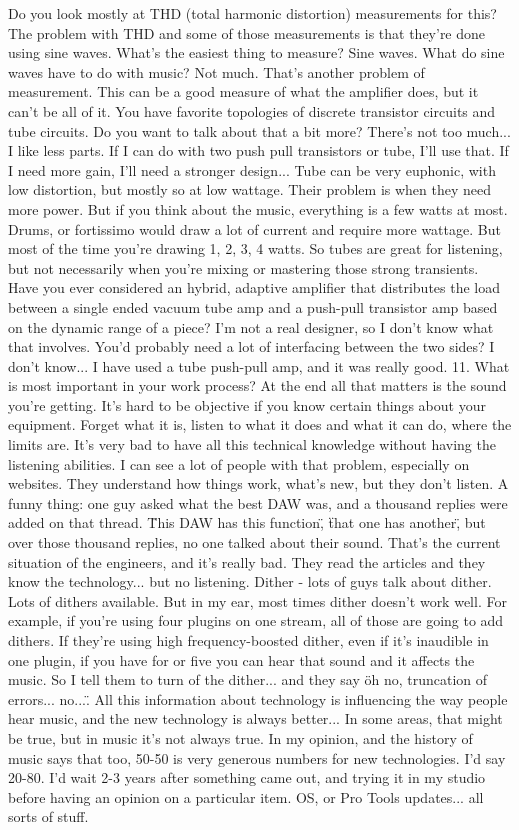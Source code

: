 Do you look mostly at THD (total harmonic distortion) measurements for this?
The problem with THD and some of those measurements is that they're done using sine waves. What's the easiest thing to measure? Sine waves. What do sine waves have to do with music? Not much. That's another problem of measurement. This can be a good measure of what the amplifier does, but it can't be all of it.
You have favorite topologies of discrete transistor circuits and tube circuits. Do you want to talk about that a bit more?
There's not too much... I like less parts. If I can do with two push pull transistors or tube, I'll use that. If I need more gain, I'll need a stronger design... Tube can be very euphonic, with low distortion, but mostly so at low wattage. Their problem is when they need more power. But if you think about the music, everything is a few watts at most. Drums, or fortissimo would draw a lot of current and require more wattage. But most of the time you're drawing 1, 2, 3, 4 watts. So tubes are great for listening, but not necessarily when you're mixing or mastering those strong transients.
Have you ever considered an hybrid, adaptive amplifier that distributes the load between a single ended vacuum tube amp and a push-pull transistor amp based on the dynamic range of a piece?
I'm not a real designer, so I don't know what that involves. You'd probably need a lot of interfacing between the two sides? I don't know... I have used a tube push-pull amp, and it was really good.
11. What is most important in your work process?
At the end all that matters is the sound you're getting. It's hard to be objective if you know certain things about your equipment. Forget what it is, listen to what it does and what it can do, where the limits are. It's very bad to have all this technical knowledge without having the listening abilities. I can see a lot of people with that problem, especially on websites. They understand how things work, what's new, but they don't listen.
A funny thing: one guy asked what the best DAW was, and a thousand replies were added on that thread. \"This DAW has this function\", \"that one has another\", but over those thousand replies, no one talked about their sound. That's the current situation of the engineers, and it's really bad. They read the articles and they know the technology... but no listening.
Dither - lots of guys talk about dither. Lots of dithers available. But in my ear, most times dither doesn't work well. For example, if you're using four plugins on one stream, all of those are going to add dithers. If they're using high frequency-boosted dither, even if it's inaudible in one plugin, if you have for or five you can hear that sound and it affects the music. So I tell them to turn of the dither... and they say \"oh no, truncation of errors... no...\". All this information about technology is influencing the way people hear music, and the new technology is always better... In some areas, that might be true, but in music it's not always true. In my opinion, and the history of music says that too, 50-50 is very generous numbers for new technologies. I'd say 20-80. I'd wait 2-3 years after something came out, and trying it in my studio before having an opinion on a particular item. OS, or Pro Tools updates... all sorts of stuff.

